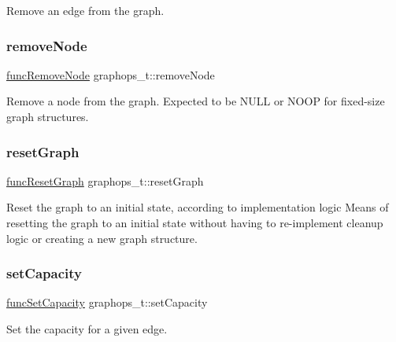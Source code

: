 Remove an edge from the graph. 

\mbox{\label{structgraphops__t_a6f3cb37e537a56ef77622056d7b409d3}} 
\subsubsection{\texorpdfstring{remove\+Node}{removeNode}}
{\footnotesize\ttfamily \hyperlink{graphops_8h_af899b37f71f9610e62b98e13212d59da}{func\+Remove\+Node} graphops\+\_\+t\+::remove\+Node}



Remove a node from the graph. Expected to be N\+U\+LL or N\+O\+OP for fixed-\/size graph structures. 

\mbox{\label{structgraphops__t_a5e4e69eeeb8e25607c3af5dfcdbb88aa}} 
\subsubsection{\texorpdfstring{reset\+Graph}{resetGraph}}
{\footnotesize\ttfamily \hyperlink{graphops_8h_afbe0356f92d2a45740225f068371f4bc}{func\+Reset\+Graph} graphops\+\_\+t\+::reset\+Graph}



Reset the graph to an initial state, according to implementation logic Means of resetting the graph to an initial state without having to re-\/implement cleanup logic or creating a new graph structure. 

\mbox{\label{structgraphops__t_a6f05f8daf75bc380988e20e019681c0a}} 
\subsubsection{\texorpdfstring{set\+Capacity}{setCapacity}}
{\footnotesize\ttfamily \hyperlink{graphops_8h_aafd2cceeca9e12b071826c74ce049e7b}{func\+Set\+Capacity} graphops\+\_\+t\+::set\+Capacity}

Set the capacity for a given edge. \mbox{\label{structgraphops__t_ad62e88e4ea9ffdae0c3fb681433e3d92}} 
